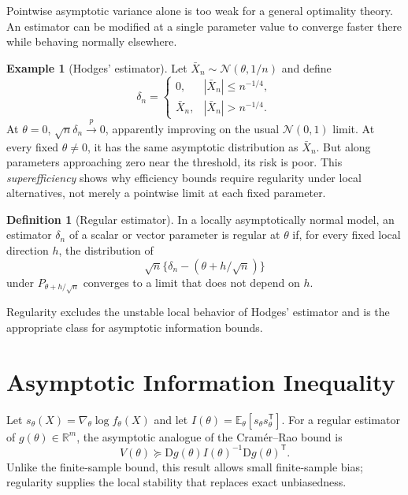 \documentclass[12pt,oneside]{book}
\numberwithin{equation}{section}
\theoremstyle{definition}
\newtheorem{definition}{Definition}[section]
\newtheorem{example}{Example}[section]
\theoremstyle{plain}
\theoremstyle{remark}
\newcommand{\R}{\mathbb{R}}
\newcommand{\E}{\mathbb{E}}
\newcommand{\convp}{\overset{p}{\to}}
\newcommand{\abs}[1]{\left\lvert #1 \right\rvert}
\newcommand{\grad}{\nabla}
\newcommand{\Normal}{\mathcal{N}}
\begin{document}
Pointwise asymptotic variance alone is too weak for a general optimality
theory.  An estimator can be modified at a single parameter value to converge
faster there while behaving normally elsewhere.

\begin{example}[Hodges' estimator]
Let $\bar X_n\sim\Normal(\theta,1/n)$ and define
\[
 \delta_n=
 \begin{cases}
  0,&\abs{\bar X_n}\leq n^{-1/4},\\
  \bar X_n,&\abs{\bar X_n}>n^{-1/4}.
 \end{cases}
\]
At $\theta=0$, $\sqrt n\delta_n\convp0$, apparently improving on the usual
$\Normal(0,1)$ limit.  At every fixed $\theta\neq0$, it has the same
asymptotic distribution as $\bar X_n$.  But along parameters approaching zero
near the threshold, its risk is poor.  This \emph{superefficiency} shows why
efficiency bounds require regularity under local alternatives, not merely a
pointwise limit at each fixed parameter.
\end{example}

\begin{definition}[Regular estimator]
In a locally asymptotically normal model, an estimator $\delta_n$ of a scalar
or vector parameter is regular at $\theta$ if, for every fixed local direction
$h$, the distribution of
\[
    \sqrt n\{\delta_n-(\theta+h/\sqrt n)\}
\]
under $P_{\theta+h/\sqrt n}$ converges to a limit that does not depend on $h$.
\end{definition}

Regularity excludes the unstable local behavior of Hodges' estimator and is
the appropriate class for asymptotic information bounds.

\section{Asymptotic Information Inequality}

Let $s_\theta(X)=\grad_\theta\log f_\theta(X)$ and let
$I(\theta)=\E_\theta[s_\theta s_\theta^\mathsf T]$.  For a regular estimator
of $g(\theta)\in\R^m$, the asymptotic analogue of the Cram\'er--Rao bound is
\begin{equation}
    V(\theta)\succeq
    \mathrm Dg(\theta)I(\theta)^{-1}
    \mathrm Dg(\theta)^\mathsf T.
    \label{eq:asymptotic-information-bound}
\end{equation}
Unlike the finite-sample bound, this result allows small finite-sample bias;
regularity supplies the local stability that replaces exact unbiasedness.
\end{document}
